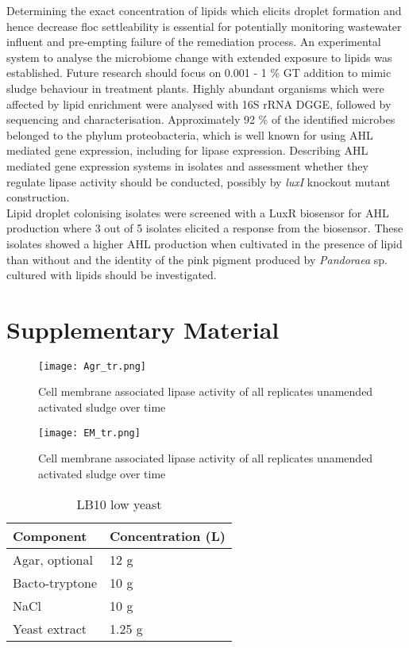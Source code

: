\documentclass[twoside]{article}
\begin{document}
Determining the exact concentration of lipids which elicits droplet formation and hence decrease floc settleability is essential for potentially monitoring wastewater influent and pre-empting failure of the remediation process. An experimental system to analyse the microbiome change with extended exposure to lipids was established. Future research should focus on 0.001 - 1 \% GT addition to mimic sludge behaviour in treatment plants. Highly abundant organisms which were affected by lipid enrichment were analysed with 16S rRNA DGGE, followed by sequencing and characterisation. Approximately 92 \% of the identified microbes belonged to the phylum proteobacteria, which is well known for using AHL mediated gene expression, including for lipase expression. Describing AHL mediated gene expression systems in isolates and assessment whether they regulate lipase activity should be conducted, possibly by \emph{luxI} knockout mutant construction.\\

Lipid droplet colonising isolates were screened with a LuxR biosensor for AHL production where 3 out of 5 isolates elicited a response from the biosensor. These isolates showed a higher AHL production when cultivated in the presence of lipid than without and the identity of the pink pigment produced by \emph{Pandoraea} sp. cultured with lipids should be investigated.
\newpage 
\thispagestyle{plain}



\newpage 
\FloatBarrier
\section{Supplementary Material}


\begin{figure}
\texttt{[image: Agr\_tr.png]}
\caption{Cell membrane associated lipase activity of all replicates unamended activated sludge over time}
\end{figure}

\begin{figure}
\texttt{[image: EM\_tr.png]}
\caption{Cell membrane associated lipase activity of all replicates unamended activated sludge over time}
\end{figure}

\FloatBarrier
\thispagestyle{plain}
\begin{table}
\caption{LB10 low yeast}
\begin{tabular}{  p{6.9cm} | p{6.9cm} }
\hline
Component & Concentration (L) \\
\hline
 Agar, optional & 12 g  \\
Bacto-tryptone    & 10 g  \\
   NaCl   & 10 g  \\
    Yeast extract    & 1.25 g \\
  \hline
\end{tabular}
\end{table}
\end{document}
